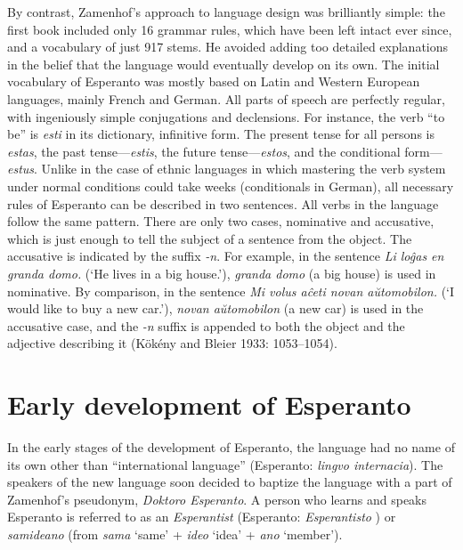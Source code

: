 By contrast, Zamenhof's approach to language design was brilliantly simple: the first book included only 16 grammar rules, which have been left intact ever since, and a vocabulary of just 917 stems.
He avoided adding too detailed explanations in the belief that the language would eventually develop on its own.
The initial vocabulary of Esperanto was mostly based on Latin and Western European languages, mainly French and German.
All parts of speech are perfectly regular, with ingeniously simple conjugations and declensions.
For instance, the verb ``to be'' is \textit{esti} in its dictionary, infinitive form.
The present tense for all persons is \textit{estas}, the past tense---\textit{estis}, the future tense---\textit{estos}, and the conditional form---\textit{estus}.
Unlike in the case of ethnic languages in which mastering the verb system under normal conditions could take weeks (conditionals in German), all necessary rules of Esperanto can be described in two sentences.
All verbs in the language follow the same pattern.
There are only two cases, nominative and accusative, which is just enough to tell the subject of a sentence from the object.
The accusative is indicated by the suffix \textit{-n}.
For example, in the sentence \textit{Li loĝas en granda domo.} (`He lives in a big house.'), \textit{granda domo} (a big house) is used in nominative.
By comparison, in the sentence \textit{Mi volus aĉeti novan aŭtomobilon.} (`I would like to buy a new car.'), \textit{novan aŭtomobilon} (a new car) is used in the accusative case, and the \textit{-n} suffix is appended to both the object and the adjective describing it
(Kökény and Bleier 1933: 1053--1054).


\section{Early development of Esperanto}

In the early stages of the development of Esperanto, the language had no name of its own other than ``international language'' (Esperanto: \textit{lingvo internacia}).
The speakers of the new language soon decided to baptize the language with a part of Zamenhof's pseudonym, \textit{Doktoro Esperanto}.
A person who learns and speaks Esperanto is referred to as an \textit{Esperantist} (Esperanto: \textit{Esperantisto}%
) or \textit{samideano} (from \textit{sama} `same' + \textit{ideo} `idea' + \textit{ano} `member').

